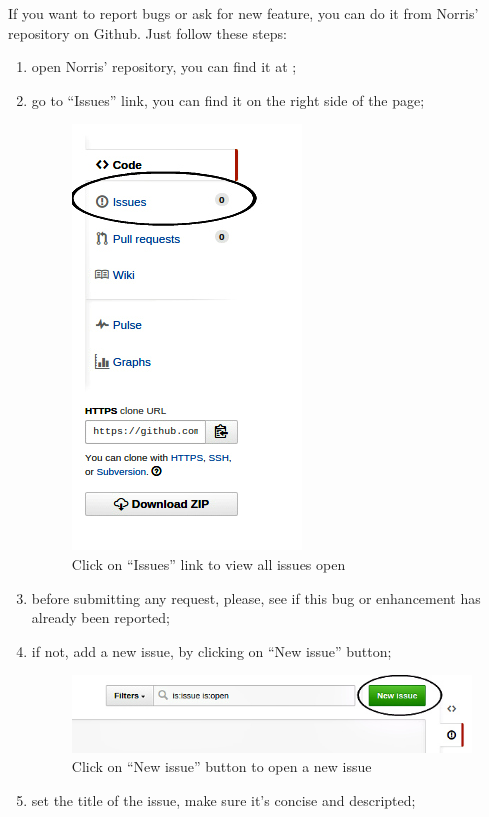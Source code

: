 If you want to report bugs or ask for new feature, you can do it from Norris' repository on Github. Just follow these steps:
\begin{enumerate}
	\item open Norris' repository, you can find it at \insuri{};
	\item go to “Issues” link, you can find it on the right side of the page;
	\begin{figure}[H]
		\centering
		\includegraphics[scale=0.6]{Pics/Issues.jpg}
		\caption{Click on “Issues” link to view all issues open}
	\end{figure}
	\item before submitting any request, please, see if this bug or enhancement has already been reported;
	\item if not, add a new issue, by clicking on “New issue” button;
	\begin{figure}[H]
		\centering
		\includegraphics[scale=0.6]{Pics/NewIssue.jpg}
		\caption{Click on “New issue” button to open a new issue}
	\end{figure}
	\item set the title of the issue, make sure it's concise and descripted;

\end{enumerate}
